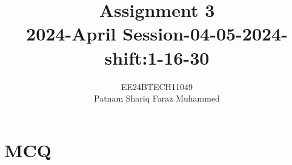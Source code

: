 \documentclass[journal]{IEEEtran}
\numberwithin{equation}{enumi}
\numberwithin{figure}{enumi}
\begin{document}


\title{Assignment 3 \\ 2024-April Session-04-05-2024-shift:1-16-30}
\author{EE24BTECH11049 \\ Patnam Shariq Faraz Muhammed}

{\let\newpage\relax\maketitle}

\section{MCQ}
\end{document}
